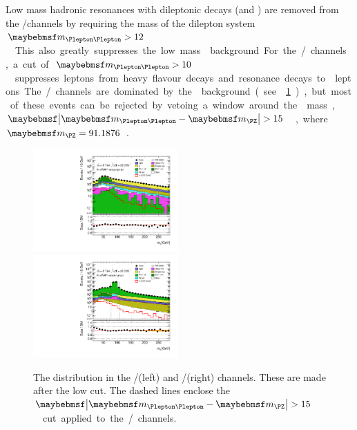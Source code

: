 Low mass hadronic resonances with dileptonic decays (\eg \PJpsi and \PUpsilon) are removed 
from the \eech/\mmch channels by requiring the mass of the dilepton system 
\unit{$\mll > 12$}{\GeV}. This also greatly suppresses the low mass \DY background. For the 
\emch/\mech channels, a cut of \unit{$\mll > 10$}{\GeV} suppresses leptons from heavy 
flavour decays and resonance decays to \Ptau leptons. The \eech/\mmch channels are dominated 
by the \DY background (see \Figure~\ref{fig:sel:mll}), but most of these events can be 
rejected by vetoing a window around the \PZ mass, \unit{$\mods{\mll - \mZ} > 15$}{\GeV}, 
where \unit{$\mZ = 91.1876$}{\GeV}.

\begin{figure}
	\includegraphics[width=0.495\textwidth]{tex/selection/emme_CutMll_Mll_mh125_log}
	\hfill
	\includegraphics[width=0.495\textwidth]{tex/selection/eemm_CutMll_Mll_mh125_log}
	\caption{The \mll distribution in the \emch/\mech (left) and \eech/\mmch (right) 
	channels. These are made after the low \mll cut. The dashed lines enclose the 
	\unit{$\mods{\mll - \mZ} > 15$}{\GeV} cut applied to the \eech/\mmch channels.}
	\label{fig:sel:mll}
\end{figure}

